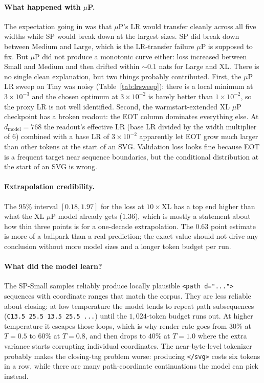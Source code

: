 \documentclass[11pt]{article}
\begin{document}
\paragraph{What happened with $\mu$P.}
The expectation going in was that $\mu$P's LR would transfer cleanly across all five widths while SP would break down at the largest sizes. SP did break down between Medium and Large, which is the LR-transfer failure $\mu$P is supposed to fix. But $\mu$P did not produce a monotonic curve either: loss increased between Small and Medium and then drifted within $\sim\!0.1$ nats for Large and XL. There is no single clean explanation, but two things probably contributed. First, the $\mu$P LR sweep on Tiny was noisy (Table~\ref{tab:lrsweep}): there is a local minimum at $3\!\times\!10^{-3}$ and the chosen optimum at $3\!\times\!10^{-2}$ is barely better than $1\!\times\!10^{-2}$, so the proxy LR is not well identified. Second, the warmstart-extended XL $\mu$P checkpoint has a broken readout: the EOT column dominates everything else. At $d_{\text{model}}\!=\!768$ the readout's effective LR (base LR divided by the width multiplier of $6$) combined with a base LR of $3\!\times\!10^{-2}$ apparently let EOT grow much larger than other tokens at the start of an SVG. Validation loss looks fine because EOT is a frequent target near sequence boundaries, but the conditional distribution at the start of an SVG is wrong.

\paragraph{Extrapolation credibility.}
The $95\%$ interval $[0.18, 1.97]$ for the loss at $10\!\times\!$XL has a top end higher than what the XL $\mu$P model already gets ($1.36$), which is mostly a statement about how thin three points is for a one-decade extrapolation. The $0.63$ point estimate is more of a ballpark than a real prediction; the exact value should not drive any conclusion without more model sizes and a longer token budget per run.

\paragraph{What did the model learn?}
The SP-Small samples reliably produce locally plausible \texttt{<path d="...">} sequences with coordinate ranges that match the corpus. They are less reliable about closing: at low temperature the model tends to repeat path subsequences (\texttt{C13.5 25.5 13.5 25.5 ...}) until the $1{,}024$-token budget runs out. At higher temperature it escapes those loops, which is why render rate goes from $30\%$ at $T\!=\!0.5$ to $60\%$ at $T\!=\!0.8$, and then drops to $40\%$ at $T\!=\!1.0$ where the extra variance starts corrupting individual coordinates. The near-byte-level tokenizer probably makes the closing-tag problem worse: producing \texttt{</svg>} costs six tokens in a row, while there are many path-coordinate continuations the model can pick instead.
\end{document}
